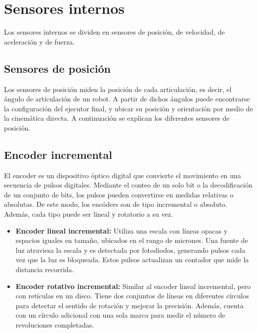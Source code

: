 \section{Sensores internos}
Los sensores internos se dividen en sensores de posición, de velocidad, de aceleración y de fuerza.

\subsection{Sensores de posición} Los sensores de posición miden la posición de cada articulación, es decir, el ángulo de articulación de un robot. A partir de dichos ángulos puede encontrarse la configuración del ejecutor final, y ubicar su posición y orientación por medio de la cinemática directa. A continuación se explican los diferentes sensores de posición.

\subsection*{Encoder incremental} El encoder es un dispositivo óptico digital que convierte el movimiento en una secuencia de pulsos digitales. Mediante el conteo de un solo bit o la decodificación de un conjunto de bits, los pulsos pueden convertirse en medidas relativas o absolutas. De este modo, los encóders son de tipo incremental o absoluto. Además, cada tipo puede ser lineal y rotatorio a su vez.

\begin{itemize}
	\item \textbf{Encoder lineal incremental:} Utiliza una escala con líneas opacas y espacios iguales en tamaño, ubicados en el rango de micrones. Una fuente de luz atraviesa la escala y es detectada por fotodiodos, generando pulsos cada vez que la luz es bloqueada. Estos pulsos actualizan un contador que mide la distancia recorrida.

	
	\item \textbf{Encoder rotativo incremental: } Similar al encoder lineal incremental, pero con retículas en un disco. Tiene dos conjuntos de líneas en diferentes círculos para detectar el sentido de rotación y mejorar la precisión. Además, cuenta con un círculo adicional con una sola marca para medir el número de revoluciones completadas.

	
\end{itemize}

